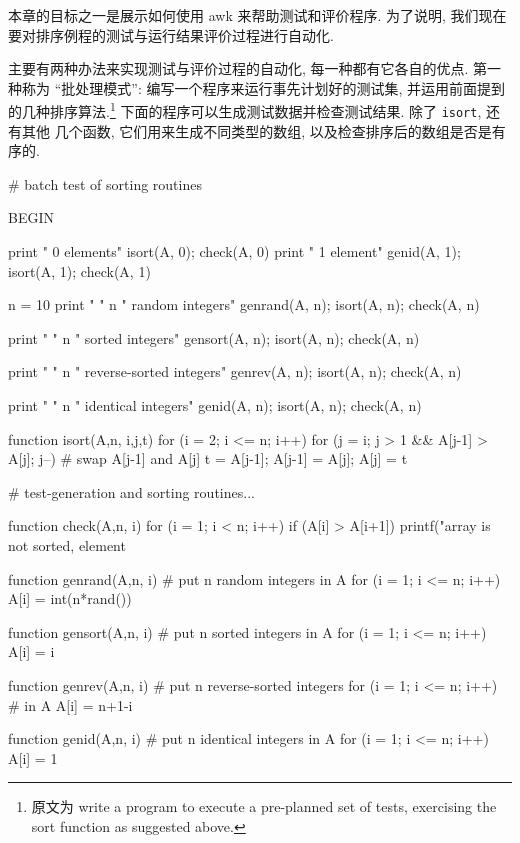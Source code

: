 本章的目标之一是展示如何使用 awk 来帮助测试和评价程序. 为了说明, 我们现在
要对排序例程的测试与运行结果评价过程进行自动化.

主要有两种办法来实现测试与评价过程的自动化, 每一种都有它各自的优点. 第一 
种称为 ``批处理模式'': 编写一个程序来运行事先计划好的测试集, 并运用前面提到
的几种排序算法.\footnote{原文为 write a program to execute a pre-planned
    set of tests, exercising the sort function as suggested
above.}
下面的程序可以生成测试数据并检查测试结果. 除了 \texttt{isort}, 还有其他
几个函数, 它们用来生成不同类型的数组, 以及检查排序后的数组是否是有序的.
\begin{awkcode}
    # batch test of sorting routines

    BEGIN {
        print "    0 elements"
        isort(A, 0); check(A, 0)    
        print "    1 element"
        genid(A, 1); isort(A, 1); check(A, 1)
        
        n = 10
        print "    " n " random integers"
        genrand(A, n); isort(A, n); check(A, n)
        
        print "    " n " sorted integers"
        gensort(A, n); isort(A, n); check(A, n)
        
        print "    " n " reverse-sorted integers"
        genrev(A, n); isort(A, n); check(A, n)
        
        print "    " n " identical integers"
        genid(A, n); isort(A, n); check(A, n)
    }

    function isort(A,n,     i,j,t) {
        for (i = 2; i <= n; i++)
            for (j = i; j > 1 && A[j-1] > A[j]; j--) {
                # swap A[j-1] and A[j]
                t = A[j-1]; A[j-1] = A[j]; A[j] = t
            }
    }

\end{awkcode}
\begin{awkcode}
    # test-generation and sorting routines...

    function check(A,n,   i) {
        for (i = 1; i < n; i++)
            if (A[i] > A[i+1])
                printf("array is not sorted, element %
    }

    function genrand(A,n,  i) { # put n random integers in A
        for (i = 1; i <= n; i++)
            A[i] = int(n*rand())
    }

    function gensort(A,n,  i) { # put n sorted integers in A
        for (i = 1; i <= n; i++)
            A[i] = i
    }

    function genrev(A,n,  i) {  # put n reverse-sorted integers
        for (i = 1; i <= n; i++)  # in A
            A[i] = n+1-i
    }

    function genid(A,n,  i) {   # put n identical integers in A
        for (i = 1; i <= n; i++)
            A[i] = 1
    }
\end{awkcode}

